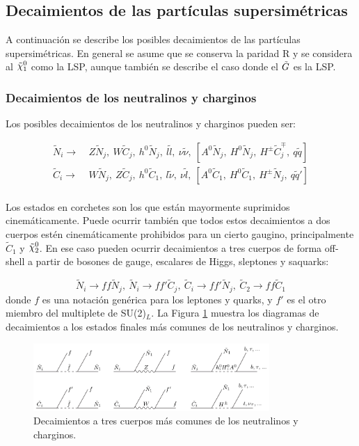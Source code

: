 \subsection{Decaimientos de las partículas supersimétricas}

A continuación se describe los posibles decaimientos de las partículas supersimétricas. En general se asume que se conserva la paridad R y se considera al $\ninoone$ como la LSP, aunque también se describe el caso donde el $\tilde{G}$ es la LSP.

\subsubsection{Decaimientos de los neutralinos y charginos}

Los posibles decaimientos de los neutralinos y charginos pueden ser:

\begin{equation}
	\begin{split}
		\tilde{N}_i \to &\ Z\tilde{N}_j,\ W\tilde{C}_j,\ h^0\tilde{N}_j,\ l\tilde{l},\ \nu\tilde{\nu},\ [A^0\tilde{N}_j,\ H^0\tilde{N}_j,\ H^{\pm}\tilde{C}_j^{\mp},\ q\tilde{q}] \\
		\tilde{C}_i \to &\ W\tilde{N}_j,\ Z\tilde{C}_j,\ h^0\tilde{C}_1,\ l\tilde{\nu},\ \nu\tilde{l},\ [A^0\tilde{C}_1,\ H^0\tilde{C}_1,\ H^{\pm}\tilde{N}_j,\ q\tilde{q}'] \\
	\end{split}
\end{equation}

Los estados en corchetes son los que están mayormente suprimidos cinemáticamente. Puede ocurrir también que todos estos decaimientos a dos cuerpos estén cinemáticamente prohibidos para un cierto gaugino, principalmente $\tilde{C}_1$ y $\ninotwo$. En ese caso pueden ocurrir decaimientos a tres cuerpos de forma off-shell a partir de bosones de gauge, escalares de Higgs, sleptones y saquarks:

\begin{equation}
	\tilde{N}_i \to ff\tilde{N}_j,\ \tilde{N}_i \to ff'\tilde{C}_j,\ \tilde{C}_i \to ff'\tilde{N}_j,\ \tilde{C}_2 \to ff\tilde{C}_1
\end{equation}
%
donde $f$ es una notación genérica para los leptones y quarks, y $f'$ es el otro miembro del multiplete de SU(2)$_L$. La Figura \ref{fig:susy_three_body_decays} muestra los diagramas de decaimientos a los estados finales más comunes de los neutralinos y charginos.

\begin{figure}[H]
  \centering
  \includegraphics[width=0.8\textwidth]{images/nc_decays.png}
  \caption{Decaimientos a tres cuerpos más comunes de los neutralinos y charginos.}
  \label{fig:susy_three_body_decays}
\end{figure}

